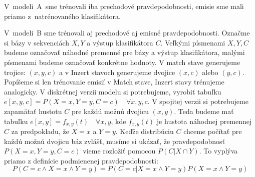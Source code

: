 V~modeli~A~sme trénovali iba prechodové pravdepodobnosti, emisie sme mali priamo z~natrénovaného klasifikátora.

V~modeli~B sme trénovali aj prechodové aj emisné pravdepodobnosti.
Označme si bázy v sekvenciách $X, Y$ a výstup klasifikátora $C$. Veľkými písmenami $X, Y, C$ budeme označovať náhodné premenné pre bázy a výstup klasifikátora, malými písmenami budeme označovať konkrétne hodnoty. V match stave generujeme trojice: $(x, y, c)$ a v Inzert stavoch generujeme dvojice $(x, c)$ alebo $(y, c)$. Popíšeme si len trénovanie emisií v Match stave, Inzert stavy trénujeme analogicky. V diskrétnej verzii modelu si potrebujeme, vyrobiť tabuľku $e[x, y, c] = P(X=x, Y=y, C=c)\quad \forall x, y, c$. V spojitej verzii si potrebujeme zapamätať hustotu $C$ pre každú možnú dvojicu $(x, y)$. Teda budeme mať tabuľku $e[x, y] = f_{x,y}(t)\quad \forall x, y$, kde $f_{x,y}(t)$ je hustota náhodnej premennej $C$ za predpokladu, že $X=x$ a $Y=y$.
Keďže distribúciu $C$ chceme počítať pre každú možnú dvojicu báz zvlášť, musíme si ukázať, že pravdepodobnosť $P(X=x, Y=y, C=c)$ vieme rozložiť pomocou $P(C|X \cap Y)$. To vyplýva priamo z definície podmienenej pravdepodobnosti:
$$P\left(C=c \wedge X=x \wedge Y=y\right) = P\left(C=c | X=x \wedge Y=y\right) P\left(X=x \wedge Y=y\right)$$





